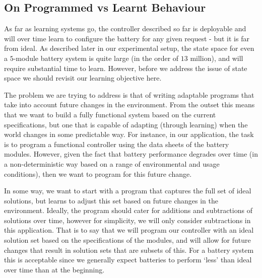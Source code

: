 \subsection{On Programmed vs Learnt Behaviour}\label{subsec:constraints}

As far as learning systems go, the controller described so far is deployable and will over time learn to configure the battery for any given request - but it is far from ideal. As described later in our experimental setup, the state space for even a $5$-module battery system is quite large (in the order of $13$ million), and will require substantial time to learn. However, before we address the issue of state space we should revisit our learning objective here.

The problem we are trying to address is that of writing adaptable programs that take into account future changes in the environment. From the outset this means that we want to build a fully functional system based on the current specifications, but one that is capable of adapting (through learning) when the world changes in some predictable way. For instance, in our application, the task is to program a functional controller using the data sheets of the battery modules. However, given the fact that battery performance degrades over time (in a non-deterministic way based on a range of environmental and usage conditions), then we want to program for this future change. 

In some way, we want to start with a program that captures the full set of ideal solutions, but learns to adjust this set based on future changes in the environment. Ideally, the program should cater for additions and subtractions of solutions over time, however for simplicity, we will only consider subtractions in this application. That is to say that we will program our controller with an ideal solution set based on the specifications of the modules, and will allow for future changes that result in solution sets that are subsets of this. For a battery system this is acceptable since we generally expect batteries to perform `less' than ideal over time than at the beginning.

